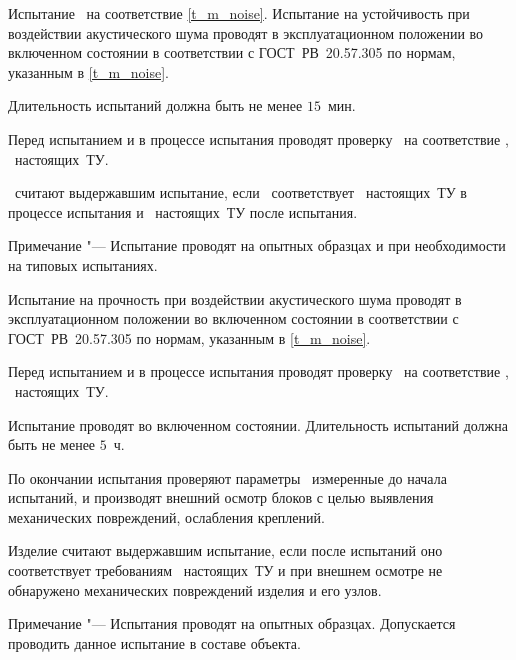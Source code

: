 Испытание \dut \ на соответствие \ref{t_m_noise}.
\subpoint
Испытание на устойчивость при воздействии акустического шума проводят в эксплуатационном положении во включенном состоянии в соответствии с ГОСТ~РВ~20.57.305 по нормам, указанным в \ref{t_m_noise}. 

Длительность испытаний должна быть не менее $15$~мин.

Перед испытанием и в процессе испытания проводят проверку \dut \ на соответствие \treb, \trebafter \ настоящих~ТУ.

\dut \ считают выдержавшим испытание, если \dut \ соответствует \treb \ настоящих~ТУ в процессе испытания и \trebafter \ настоящих~ТУ после испытания.

Примечание "--- Испытание проводят на опытных образцах и при необходимости на типовых испытаниях.

\subpoint
Испытание на прочность при воздействии акустического шума проводят в эксплуатационном положении во включенном состоянии в соответствии с ГОСТ~РВ~20.57.305 по нормам, указанным в \ref{t_m_noise}. 

Перед испытанием и в процессе испытания проводят проверку \dut \ на соответствие \treb, \trebafter \ настоящих~ТУ.

Испытание проводят во включенном состоянии. Длительность испытаний должна быть не менее $5$~ч.

По окончании испытания проверяют параметры \dut \, измеренные до начала испытаний, и производят внешний осмотр блоков с целью выявления механических повреждений, ослабления креплений.

Изделие считают выдержавшим испытание, если после испытаний оно соответствует требованиям \treb \ настоящих~ТУ и при внешнем осмотре не обнаружено механических повреждений изделия и его узлов.

Примечание "--- Испытания проводят на опытных образцах. Допускается проводить данное испытание в составе объекта.